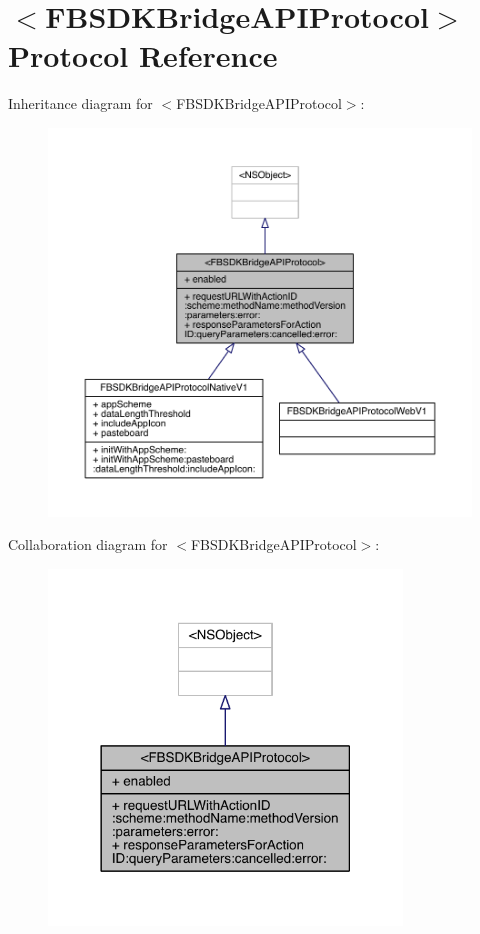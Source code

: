 \hypertarget{protocol_f_b_s_d_k_bridge_a_p_i_protocol-p}{\section{$<$F\-B\-S\-D\-K\-Bridge\-A\-P\-I\-Protocol$>$ Protocol Reference}
\label{protocol_f_b_s_d_k_bridge_a_p_i_protocol-p}
}


Inheritance diagram for $<$F\-B\-S\-D\-K\-Bridge\-A\-P\-I\-Protocol$>$\-:
\nopagebreak
\begin{figure}[H]
\begin{center}
\leavevmode
\includegraphics[width=350pt]{protocol_f_b_s_d_k_bridge_a_p_i_protocol-p__inherit__graph}
\end{center}
\end{figure}


Collaboration diagram for $<$F\-B\-S\-D\-K\-Bridge\-A\-P\-I\-Protocol$>$\-:
\nopagebreak
\begin{figure}[H]
\begin{center}
\leavevmode
\includegraphics[width=266pt]{protocol_f_b_s_d_k_bridge_a_p_i_protocol-p__coll__graph}
\end{center}
\end{figure}
